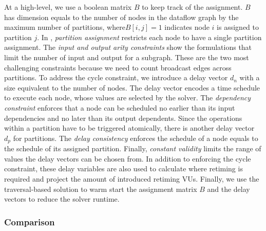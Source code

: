 At a high-level, we use a boolean matrix $B$ to keep track of the assignment. 
$B$ has dimension equals to the number of nodes in the dataflow graph by the maximum number of partitions, where$B[i,j]=1$ 
indicates node $i$ is assigned to partition $j$.
In , \emph{partition assignment} restricts each node to have a single partition assignment.
The \emph{input and output arity constraints} show the formulations that limit the number of input
and output for a subgraph.
These are the two most challenging constraints because we need to count broadcast edges across partitions.
To address the cycle constraint, we introduce a delay vector $d_n$ with a size equivalent to the number of nodes. 
The delay vector encodes a time schedule to execute each node, whose values are selected by the solver.
The \emph{dependency constraint} enforces that a node can be scheduled no earlier than its input dependencies and
no later than its output dependents.
Since the operations within a partition have to be triggered atomically, there is another delay
vector $d_p$ for partitions. The \emph{delay consistency} enforces the schedule of a node equals to the
schedule of its assigned partition.
Finally, \emph{constant validity} limits the range of values the delay vectors can be chosen from.
In addition to enforcing the cycle constraint, 
these delay variables are also used to calculate where retiming is required and project the amount of introduced retiming VUs. 
Finally, we use the traversal-based solution to warm start the assignment matrix
$B$ and the delay vectors to reduce the solver runtime.

\subsubsection{Comparison}

